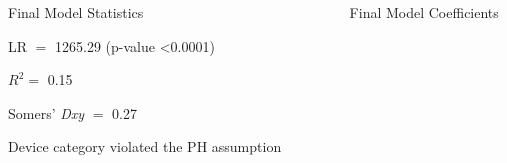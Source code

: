 \documentclass[final]{beamer}
\newlength{\sepwid}
\newlength{\onecolwid}
\newlength{\twocolwid}
\begin{document}
\begin{frame}[t]
\begin{columns}[t]
\begin{column}{\onecolwid}
\vspace{2ex}


\begin{block}{Final Model Statistics}

\textcolor{dblue!70}{} LR $=$ 1265.29 (p-value \textless0.0001)

\vspace{0.5ex}

\textcolor{dblue!70}{} $R^2 =$ 0.15

\vspace{0.5ex}

\textcolor{dblue!70}{} Somers' \textit{Dxy} $=$ 0.27

\vspace{0.5ex}

\textcolor{dblue!70}{} Device category violated the PH assumption

\end{block}


\end{column} %

\begin{column}{\sepwid}\end{column} %

\begin{column}{\twocolwid} %



\begin{block}{Final Model Coefficients}
\end{block}


\end{column}
\end{columns}
\end{frame}
\end{document}
